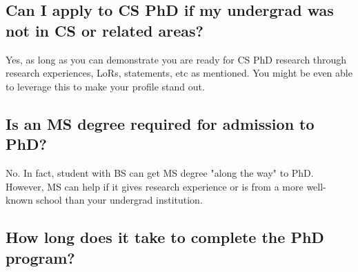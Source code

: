 \documentclass[11pt]{article}
\begin{document}




\subsection{Can I apply to CS PhD if my undergrad was not in CS or related areas?}

Yes, as long as you can demonstrate you are ready for CS PhD research through research experiences, LoRs, statements, etc as mentioned. You might be even able to leverage this to make your profile stand out.



\subsection{Is an MS degree required for admission to PhD?}
No. In fact, student with BS can get MS degree "along the way" to PhD.  However, MS can help if it gives research experience or is from a more well-known school than your undergrad institution.
    

\subsection{How long does it take to complete the PhD program?}
\end{document}
